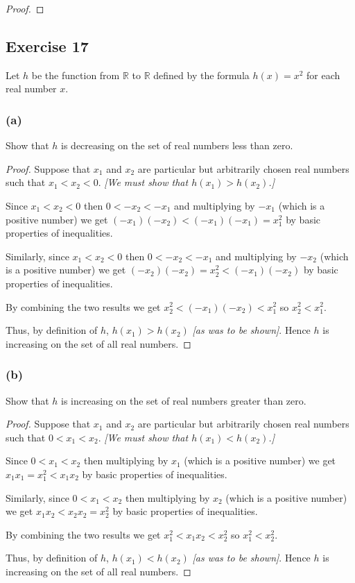 \documentclass[14pt]{extarticle}
\newcommand{\R}{\mathbb{R}}
\begin{document}
\begin{proof}

\end{proof}

\subsection{Exercise 17}
Let \(h\) be the function from \(\R\) to \(\R\) defined by the formula \(h(x) = x^2\) for each real number \(x\).

\subsubsection{(a)}
Show that \(h\) is decreasing on the set of real numbers less than zero.

\begin{proof}
Suppose that \(x_1\) and \(x_2\) are particular but arbitrarily chosen real numbers such that \(x_1 < x_2 < 0\). 
{\it [We must show that \(h(x_1) > h(x_2)\).]} 

Since \(x_1 < x_2 < 0\) then \(0 < -x_2 < -x_1\) and multiplying by \(-x_1\) (which is a positive number) we get 
\((-x_1)(-x_2) < (-x_1)(-x_1) = x_1^2\) by basic properties of inequalities. 

Similarly, since \(x_1 < x_2 < 0\) then \(0 < -x_2 < -x_1\) and multiplying by \(-x_2\) (which is a positive number) we 
get \((-x_2)(-x_2) = x_2^2 < (-x_1)(-x_2)\) by basic properties of inequalities. 

By combining the two results we get \(x_2^2 < (-x_1)(-x_2) < x_1^2\) so \(x_2^2 < x_1^2\).

Thus, by definition of \(h\), \(h(x_1) > h(x_2)\) {\it [as was to be shown]}. Hence \(h\) is increasing on the set of all 
real numbers.
\end{proof}

\subsubsection{(b)}
Show that \(h\) is increasing on the set of real numbers greater than zero.

\begin{proof}
Suppose that \(x_1\) and \(x_2\) are particular but arbitrarily chosen real numbers such that \(0 < x_1 < x_2\). 
{\it [We must show that \(h(x_1) < h(x_2)\).]} 

Since \(0 < x_1 < x_2\) then multiplying by \(x_1\) (which is a positive number) we get \(x_1x_1 = x_1^2 < x_1x_2\) by basic 
properties of inequalities. 

Similarly, since \(0 < x_1 < x_2\) then multiplying by \(x_2\) (which is a positive number) we get \(x_1x_2 < x_2x_2 = 
x_2^2\) by basic properties of inequalities. 

By combining the two results we get \(x_1^2 < x_1x_2 < x_2^2\) so \(x_1^2 < x_2^2\).

Thus, by definition of \(h\), \(h(x_1) < h(x_2)\) {\it [as was to be shown]}. Hence \(h\) is increasing on the set of all 
real numbers.
\end{proof}
\end{document}
